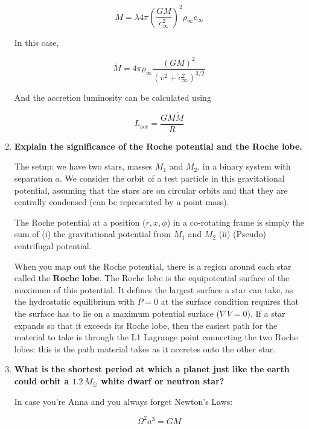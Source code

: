 \documentclass[a4paper]{article}
\begin{document}
\begin{enumerate}
\begin{equation}
\dot{M} = \lambda 4 \pi \left(\frac{GM}{c^2_\infty}\right)^2 \rho_\infty c_\infty
\end{equation}

In this case, 

\begin{equation}
\dot{M} = 4 \pi \rho_\infty \frac{(GM)^2}{(v^2+c^2_\infty)^{3/2}}
\end{equation}

And the accretion luminosity can be calculated using

\begin{equation}
L_\mathrm{acc} = \frac{G M \dot{M}}{R}
\end{equation}

\item \textbf{Explain the significance of the Roche potential and the Roche lobe.}

The setup: we have two stars, masses $M_1$ and $M_2$, in a binary system with separation $a$. We consider the orbit of a test particle in this gravitational potential, assuming that the stars are on circular orbits and that they are centrally condensed (can be represented by a point mass). 

The Roche potential at a position ($r,x,\phi$) in a co-rotating frame is simply the sum of (i) the gravitational potential from $M_1$ and $M_2$ (ii) (Pseudo) centrifugal potential.

When you map out the Roche potential, there is a region around each star called the $\textbf{Roche lobe}$. The Roche lobe is the equipotential surface of the maximum of this potential. It defines the largest surface a star can take, as the hydrostatic equilibrium with $P = 0$ at the surface condition requires that the surface has to lie on a maximum potential surface ($\nabla V = 0$). If a star expands so that it exceeds its Roche lobe, then the easiest path for the material to take is through the L1 Lagrange point connecting the two Roche lobes: this is the path material takes as it accretes onto the other star.  

\item \textbf{What is the shortest period at which a planet just like the earth could orbit a $1.2\,M_\odot$ white
dwarf or neutron star?}

In case you're Anna and you always forget Newton's Laws:

\begin{equation}
\Omega^2 a^3 = GM
\end{equation}


\end{enumerate}
\end{document}

